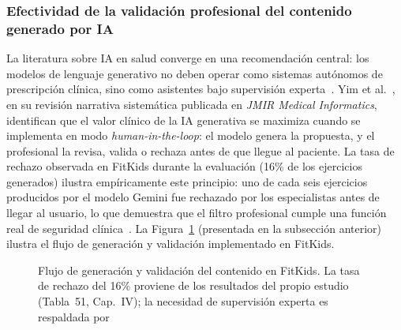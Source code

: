 			\subsubsection[La efectividad de la validación profesional]{Efectividad de la validación profesional del contenido generado por IA}
				La literatura sobre IA en salud converge en una recomendación central: los modelos de lenguaje generativo no deben operar como sistemas autónomos de prescripción clínica, sino como asistentes bajo supervisión experta~\cite{Yim2024}. Yim et al.~\cite{Yim2024}, en su revisión narrativa sistemática publicada en \textit{JMIR Medical Informatics}, identifican que el valor clínico de la IA generativa se maximiza cuando se implementa en modo \textit{human-in-the-loop}: el modelo genera la propuesta, y el profesional la revisa, valida o rechaza antes de que llegue al paciente. La tasa de rechazo observada en FitKids durante la evaluación (16\% de los ejercicios generados) ilustra empíricamente este principio: uno de cada seis ejercicios producidos por el modelo Gemini fue rechazado por los especialistas antes de llegar al usuario, lo que demuestra que el filtro profesional cumple una función real de seguridad clínica~\cite{Yim2024,Zaleski2026}. La Figura~\ref{fig:ia_pipeline} (presentada en la subsección anterior) ilustra el flujo de generación y validación implementado en FitKids.
			
				\begin{figure}[H]
					\centering
					\caption[Flujo de generación y validación del contenido en FitKids]{Flujo de generación y validación del contenido en FitKids. La tasa de rechazo del 16\% proviene de los resultados del propio estudio (Tabla~51, Cap.~IV); la necesidad de supervisión experta es respaldada por~\cite{Yim2024,Zaleski2026}}
					\label{fig:ia_pipeline}
				\end{figure}
				\tblnote
				
